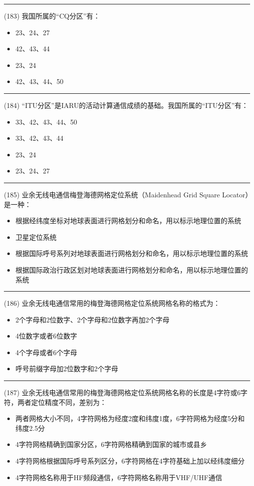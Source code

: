 \documentclass[twocolumn]{ctexart}  %
\begin{document}
\noindent\rule{0.5\textwidth}{1pt}
\heiti (183) 我国所属的“CQ分区”有： \songti {\color{gray} [LK0202] }
\begin{itemize}
	\item  23、24、27
	\item  42、43、44
	\item  23、24
	\item  42、43、44、50
\end{itemize}


\noindent\rule{0.5\textwidth}{1pt}
\heiti (184) “ITU分区”是IARU的活动计算通信成绩的基础。我国所属的“ITU分区”有： \songti {\color{gray} [LK0204] }
\begin{itemize}
	\item  33、42、43、44、50
	\item  33、42、43、44
	\item  23、24
	\item  23、24、27
\end{itemize}


\noindent\rule{0.5\textwidth}{1pt}
\heiti (185) 业余无线电通信梅登海德网格定位系统（Maidenhead Grid Square Locator）是一种： \songti {\color{gray} [LK0862] }
\begin{itemize}
	\item  根据经纬度坐标对地球表面进行网格划分和命名，用以标示地理位置的系统
	\item  卫星定位系统
	\item  根据国际呼号系列对地球表面进行网格划分和命名，用以标示地理位置的系统
	\item  根据国际政治行政区划对地球表面进行网格划分和命名，用以标示地理位置的系统
\end{itemize}


\noindent\rule{0.5\textwidth}{1pt}
\heiti (186) 业余无线电通信常用的梅登海德网格定位系统网格名称的格式为： \songti {\color{gray} [LK0863] }
\begin{itemize}
	\item  2个字母和2位数字、2个字母和2位数字再加2个字母
	\item  4位数字或者6位数字
	\item  4个字母或者6个字母
	\item  呼号前缀字母加2位数字和2个字母
\end{itemize}


\noindent\rule{0.5\textwidth}{1pt}
\heiti (187) 业余无线电通信常用的梅登海德网格定位系统网格名称的长度是4字符或6字符，两者定位精度不同，差别为： \songti {\color{gray} [LK0864] }
\begin{itemize}
	\item  两者网格大小不同，4字符网格为经度2度和纬度1度，6字符网格为经度5分和纬度2.5分
	\item  4字符网格精确到国家分区，6字符网格精确到国家的城市或县乡
	\item  4字符网格根据国际呼号系列区分，6字符网格在4字符基础上加以经纬度细分
	\item  4字符网格名称用于HF频段通信，6字符网格名称用于VHF/UHF通信
\end{itemize}
\end{document}
